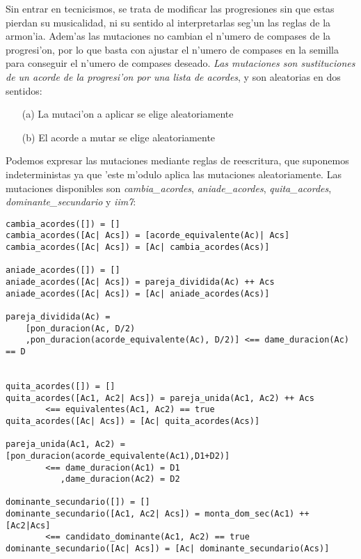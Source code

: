\begin{enumerate}
        Sin entrar en tecnicismos, se trata de modificar las progresiones sin que estas pierdan su musicalidad, ni su sentido al interpretarlas seg'un las reglas de la armon'ia. Adem'as las mutaciones no cambian el n'umero de compases de la progresi'on, por lo que basta con ajustar el n'umero de compases en la semilla para conseguir el n'umero de compases deseado.
\newline
\newline
        \emph{Las mutaciones son sustituciones de un acorde de la progresi'on por una lista de acordes}, y son aleatorias en dos sentidos:
                \begin{enumerate}
                \item[(a)] La mutaci'on a aplicar se elige aleatoriamente
                \item[(b)] El acorde a mutar se elige aleatoriamente
                \end{enumerate}

        Podemos expresar las mutaciones mediante reglas de reescritura, que suponemos indeterministas ya que 'este m'odulo aplica las mutaciones aleatoriamente. Las mutaciones disponibles son \emph{cambia\_acordes}, \emph{aniade\_acordes}, \emph{quita\_acordes}, \emph{dominante\_secundario} y \emph{iim7}:

        \begin{verbatim}
cambia_acordes([]) = []
cambia_acordes([Ac| Acs]) = [acorde_equivalente(Ac)| Acs]
cambia_acordes([Ac| Acs]) = [Ac| cambia_acordes(Acs)]

aniade_acordes([]) = []
aniade_acordes([Ac| Acs]) = pareja_dividida(Ac) ++ Acs
aniade_acordes([Ac| Acs]) = [Ac| aniade_acordes(Acs)]

pareja_dividida(Ac) =  
    [pon_duracion(Ac, D/2)
    ,pon_duracion(acorde_equivalente(Ac), D/2)] <== dame_duracion(Ac) == D


quita_acordes([]) = []
quita_acordes([Ac1, Ac2| Acs]) = pareja_unida(Ac1, Ac2) ++ Acs
        <== equivalentes(Ac1, Ac2) == true
quita_acordes([Ac| Acs]) = [Ac| quita_acordes(Acs)]

pareja_unida(Ac1, Ac2) =  [pon_duracion(acorde_equivalente(Ac1),D1+D2)] 
        <== dame_duracion(Ac1) = D1
           ,dame_duracion(Ac2) = D2

dominante_secundario([]) = []
dominante_secundario([Ac1, Ac2| Acs]) = monta_dom_sec(Ac1) ++ [Ac2|Acs]
        <== candidato_dominante(Ac1, Ac2) == true
dominante_secundario([Ac| Acs]) = [Ac| dominante_secundario(Acs)]


\end{verbatim}
\end{enumerate}
